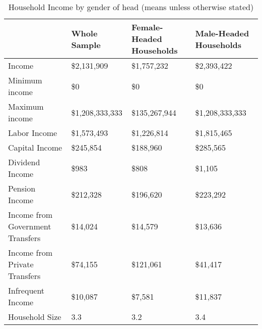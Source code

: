 \documentclass[12pt]{article}
\begin{document}
\begin{table}[]
\caption{Household Income by gender of head (means unless otherwise stated)}
\label{table:ygender}
\footnotesize
\begin{tabular}{llll}\hline
&Whole Sample                     & Female-Headed Households & Male-Headed Households                 \\ \hline
Income                           & \$2,131,909              & \$1,757,232            & \$2,393,422     \\
Minimum income                   & \$0                      & \$0                    & \$0             \\
Maximum income                   & \$1,208,333,333          & \$135,267,944          & \$1,208,333,333 \\
Labor Income                     & \$1,573,493              & \$1,226,814            & \$1,815,465     \\
Capital Income                   & \$245,854                & \$188,960              & \$285,565       \\
Dividend Income                  & \$983                    & \$808                  & \$1,105         \\
Pension Income                   & \$212,328                & \$196,620              & \$223,292       \\
Income from Government Transfers & \$14,024                 & \$14,579               & \$13,636        \\
Income from Private Transfers    & \$74,155                 & \$121,061              & \$41,417        \\
Infrequent Income                & \$10,087                 & \$7,581                & \$11,837        \\
Household Size                   & 3.3                      & 3.2                    & 3.4            \\ \hline
\end{tabular}
\end{table}
\end{document}
